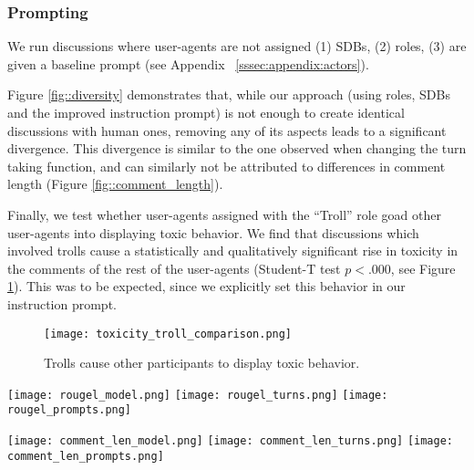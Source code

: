 \subsubsection{Prompting}

We run discussions where user-agents are not assigned (1) \acp{SDB}, (2) roles, (3) are given a baseline prompt (see Appendix ~\ref{sssec:appendix:actors}).

Figure \ref{fig::diversity} demonstrates that, while our approach (using roles, \acp{SDB} and the improved instruction prompt) is not enough to create identical discussions with human ones, removing any of its aspects leads to a significant divergence. This divergence is similar to the one observed when changing the turn taking function, and can similarly not be attributed to differences in comment length (Figure \ref{fig::comment_length}).

Finally, we test whether user-agents assigned with the “Troll” role goad other user-agents into displaying toxic behavior. We find that discussions which involved trolls cause a statistically and qualitatively significant rise in toxicity in the comments of the rest of the user-agents (Student-T test $p<.000$, see Figure \ref{fig::goad}). This was to be expected, since we explicitly set this behavior in our instruction prompt.

\begin{figure}
    \texttt{[image: toxicity\_troll\_comparison.png]} 
	\caption{Trolls cause other participants to display toxic behavior.}
	\label{fig::goad}
\end{figure}

\begin{figure*}[t]
    \texttt{[image: rougel\_model.png]} \hfill
    \texttt{[image: rougel\_turns.png]}
    \hfill
    \texttt{[image: rougel\_prompts.png]}
	\centering
	\caption{Diversity (Section \ref{ssec:methodology:diversity}) distribution for each discussion by model (Section \ref{ssec:experimental:model}), turn-taking function $u$ (Section \ref{ssec:experimental:turn}), and prompting function $\phi$ used (Section \ref{ssec:experimental:prompts}).}
	\label{fig::diversity}
\end{figure*}

\begin{figure*}[t]
    \texttt{[image: comment\_len\_model.png]} \hfill
    \texttt{[image: comment\_len\_turns.png]}
    \hfill
    \texttt{[image: comment\_len\_prompts.png]}
	\centering
	\caption{Comment length for each discussion by model (Section \ref{ssec:experimental:model}), turn-taking function $u$ (Section \ref{ssec:experimental:turn}), and prompting function $\phi$ used (Section \ref{ssec:experimental:prompts}). For ease of comparison, comments above $400$ words are marked at the end of the x-axis.}
	\label{fig::comment_length}
\end{figure*}




